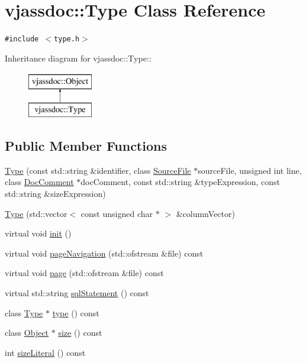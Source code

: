 \hypertarget{classvjassdoc_1_1Type}{
\section{vjassdoc::Type Class Reference}
\label{classvjassdoc_1_1Type}
}
{\tt \#include $<$type.h$>$}

Inheritance diagram for vjassdoc::Type::\begin{figure}[H]
\begin{center}
\leavevmode
\includegraphics[height=2cm]{classvjassdoc_1_1Type}
\end{center}
\end{figure}
\subsection*{Public Member Functions}
\begin{CompactItemize}
\item 
\hyperlink{classvjassdoc_1_1Type_36d55cd487a11696b179790a299d5e09}{Type} (const std::string \&identifier, class \hyperlink{classvjassdoc_1_1SourceFile}{SourceFile} $\ast$sourceFile, unsigned int line, class \hyperlink{classvjassdoc_1_1DocComment}{DocComment} $\ast$docComment, const std::string \&typeExpression, const std::string \&sizeExpression)
\item 
\hyperlink{classvjassdoc_1_1Type_f1b3774bf65bd725e70182bc66650ce7}{Type} (std::vector$<$ const unsigned char $\ast$ $>$ \&columnVector)
\item 
virtual void \hyperlink{classvjassdoc_1_1Type_d4cadc76713790490c55be0bd0af1a1d}{init} ()
\item 
virtual void \hyperlink{classvjassdoc_1_1Type_bc514be419f91658df10d742c6999e47}{pageNavigation} (std::ofstream \&file) const 
\item 
virtual void \hyperlink{classvjassdoc_1_1Type_aa7a3044fc74587aa8800b1d67b18930}{page} (std::ofstream \&file) const 
\item 
virtual std::string \hyperlink{classvjassdoc_1_1Type_22741189ccde7fa7bc63abdeaf256c92}{sqlStatement} () const 
\item 
class \hyperlink{classvjassdoc_1_1Type}{Type} $\ast$ \hyperlink{classvjassdoc_1_1Type_e0527e578a64a9f6be29176281397397}{type} () const 
\item 
class \hyperlink{classvjassdoc_1_1Object}{Object} $\ast$ \hyperlink{classvjassdoc_1_1Type_93ddef89deb764de56905c9c78074c6f}{size} () const 
\item 
int \hyperlink{classvjassdoc_1_1Type_52c75b9b928f2027d83837fc7cb279a5}{sizeLiteral} () const 
\end{CompactItemize}



